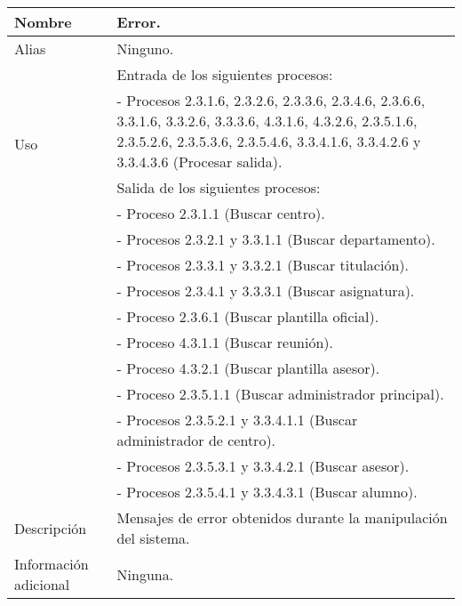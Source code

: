 \begin{center}
  \begin{tabular}{| l | p{9cm} |}
    \hline
    Nombre & \textbf{Error}.\\
    \hline
    Alias & Ninguno.\\
    \hline
    \multirow{4}{*}{Uso} & Entrada de los siguientes procesos:\\
                         & - Procesos 2.3.1.6, 2.3.2.6, 2.3.3.6, 2.3.4.6, 2.3.6.6, 3.3.1.6, 3.3.2.6, 3.3.3.6, 4.3.1.6, 4.3.2.6, 2.3.5.1.6, 2.3.5.2.6, 2.3.5.3.6, 2.3.5.4.6, 3.3.4.1.6, 3.3.4.2.6 y 3.3.4.3.6  (Procesar salida).\\
                         & Salida de los siguientes procesos:\\
                         & - Proceso 2.3.1.1  (Buscar centro).\\
                         & - Procesos 2.3.2.1 y 3.3.1.1 (Buscar departamento).\\
                         & - Procesos 2.3.3.1 y 3.3.2.1 (Buscar titulación).\\
                         & - Procesos 2.3.4.1 y 3.3.3.1 (Buscar asignatura).\\
                         & - Proceso 2.3.6.1 (Buscar plantilla oficial).\\
                         & - Proceso 4.3.1.1 (Buscar reunión).\\
                         & - Proceso 4.3.2.1 (Buscar plantilla asesor).\\
                         & - Proceso 2.3.5.1.1 (Buscar administrador principal).\\
                         & - Procesos 2.3.5.2.1 y 3.3.4.1.1 (Buscar administrador de centro).\\
                         & - Procesos 2.3.5.3.1 y 3.3.4.2.1 (Buscar asesor).\\
                         & - Procesos 2.3.5.4.1 y 3.3.4.3.1 (Buscar alumno).\\

    \hline
    Descripción & Mensajes de error obtenidos durante la manipulación del
                  sistema.\\
    \hline
    Información adicional & Ninguna.\\
    \hline
  \end{tabular}
\end{center}
